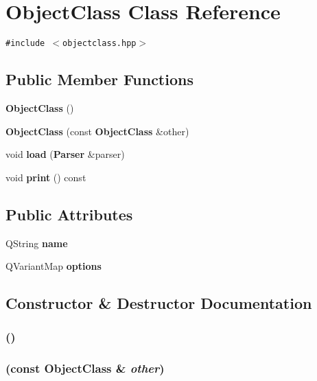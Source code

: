 \section{Object\-Class Class Reference}
\label{classObjectClass}
{\tt \#include $<$objectclass.hpp$>$}

\subsection*{Public Member Functions}
\begin{CompactItemize}
\item 
{\bf Object\-Class} ()
\item 
{\bf Object\-Class} (const {\bf Object\-Class} \&other)
\item 
void {\bf load} ({\bf Parser} \&parser)
\item 
void {\bf print} () const 
\end{CompactItemize}
\subsection*{Public Attributes}
\begin{CompactItemize}
\item 
QString {\bf name}
\item 
QVariant\-Map {\bf options}
\end{CompactItemize}


\subsection{Constructor \& Destructor Documentation}
\subsubsection{ ()}\label{classObjectClass_a0}


\subsubsection{ (const {\bf Object\-Class} \& {\em other})}\label{classObjectClass_a1}




